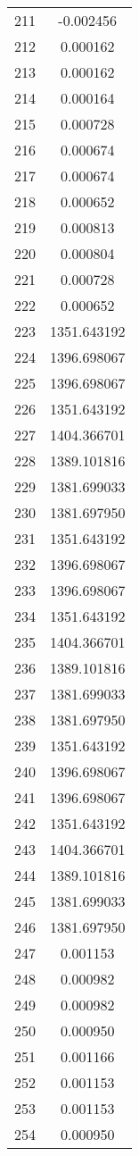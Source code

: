 \documentclass[12pt]{article}
\begin{document}
\begin{longtable}{@{}cc@{}}
211 & -0.002456 \\
212 & 0.000162 \\
213 & 0.000162 \\
214 & 0.000164 \\
215 & 0.000728 \\
216 & 0.000674 \\
217 & 0.000674 \\
218 & 0.000652 \\
219 & 0.000813 \\
220 & 0.000804 \\
221 & 0.000728 \\
222 & 0.000652 \\
223 & 1351.643192 \\
224 & 1396.698067 \\
225 & 1396.698067 \\
226 & 1351.643192 \\
227 & 1404.366701 \\
228 & 1389.101816 \\
229 & 1381.699033 \\
230 & 1381.697950 \\
231 & 1351.643192 \\
232 & 1396.698067 \\
233 & 1396.698067 \\
234 & 1351.643192 \\
235 & 1404.366701 \\
236 & 1389.101816 \\
237 & 1381.699033 \\
238 & 1381.697950 \\
239 & 1351.643192 \\
240 & 1396.698067 \\
241 & 1396.698067 \\
242 & 1351.643192 \\
243 & 1404.366701 \\
244 & 1389.101816 \\
245 & 1381.699033 \\
246 & 1381.697950 \\
247 & 0.001153 \\
248 & 0.000982 \\
249 & 0.000982 \\
250 & 0.000950 \\
251 & 0.001166 \\
252 & 0.001153 \\
253 & 0.001153 \\
254 & 0.000950 \\

\end{longtable}
\end{document}
